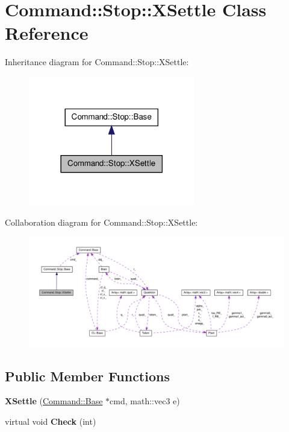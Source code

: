 \hypertarget{classCommand_1_1Stop_1_1XSettle}{\section{\-Command\-:\-:\-Stop\-:\-:\-X\-Settle \-Class \-Reference}
\label{classCommand_1_1Stop_1_1XSettle}
}


\-Inheritance diagram for \-Command\-:\-:\-Stop\-:\-:\-X\-Settle\-:\nopagebreak
\begin{figure}[H]
\begin{center}
\leavevmode
\includegraphics[width=206pt]{classCommand_1_1Stop_1_1XSettle__inherit__graph}
\end{center}
\end{figure}


\-Collaboration diagram for \-Command\-:\-:\-Stop\-:\-:\-X\-Settle\-:\nopagebreak
\begin{figure}[H]
\begin{center}
\leavevmode
\includegraphics[width=350pt]{classCommand_1_1Stop_1_1XSettle__coll__graph}
\end{center}
\end{figure}
\subsection*{\-Public \-Member \-Functions}
\begin{DoxyCompactItemize}
\item 
\hypertarget{classCommand_1_1Stop_1_1XSettle_aacbc62cb356f0441f910e837b2cd0889}{{\bfseries \-X\-Settle} (\hyperlink{classCommand_1_1Base}{\-Command\-::\-Base} $\ast$cmd, math\-::vec3 e)}\label{classCommand_1_1Stop_1_1XSettle_aacbc62cb356f0441f910e837b2cd0889}

\item 
\hypertarget{classCommand_1_1Stop_1_1XSettle_a60ea7a816a7ea0d656551aa84a484d4d}{virtual void {\bfseries \-Check} (int)}\label{classCommand_1_1Stop_1_1XSettle_a60ea7a816a7ea0d656551aa84a484d4d}

\end{DoxyCompactItemize}

